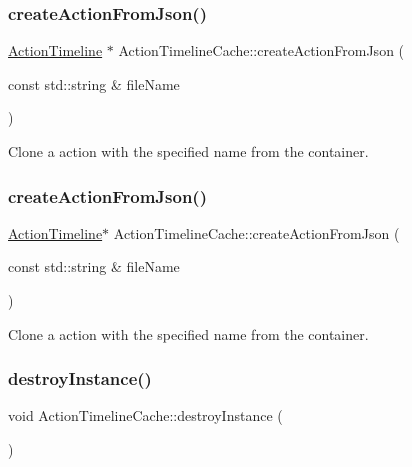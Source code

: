 \subsubsection{\texorpdfstring{create\+Action\+From\+Json()}{createActionFromJson()}\hspace{0.1cm}{\footnotesize\ttfamily [1/2]}}
{\footnotesize\ttfamily \hyperlink{classActionTimeline}{Action\+Timeline} $\ast$ Action\+Timeline\+Cache\+::create\+Action\+From\+Json (\begin{DoxyParamCaption}\item[{const std\+::string \&}]{file\+Name }\end{DoxyParamCaption})}

Clone a action with the specified name from the container. \mbox{\label{classActionTimelineCache_a0cc185b113e34b83ff5230e25d115ae8}} 
\subsubsection{\texorpdfstring{create\+Action\+From\+Json()}{createActionFromJson()}\hspace{0.1cm}{\footnotesize\ttfamily [2/2]}}
{\footnotesize\ttfamily \hyperlink{classActionTimeline}{Action\+Timeline}$\ast$ Action\+Timeline\+Cache\+::create\+Action\+From\+Json (\begin{DoxyParamCaption}\item[{const std\+::string \&}]{file\+Name }\end{DoxyParamCaption})}

Clone a action with the specified name from the container. \mbox{\label{classActionTimelineCache_a18e4737159c64d36347dc6382b525837}} 
\subsubsection{\texorpdfstring{destroy\+Instance()}{destroyInstance()}\hspace{0.1cm}{\footnotesize\ttfamily [1/2]}}
{\footnotesize\ttfamily void Action\+Timeline\+Cache\+::destroy\+Instance (\begin{DoxyParamCaption}{ }\end{DoxyParamCaption})\hspace{0.3cm}{\ttfamily [static]}}

